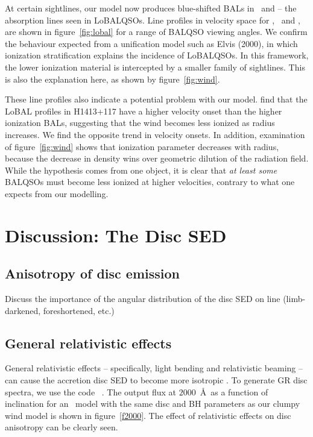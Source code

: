 \documentclass[preprint, a4paper, 11pt]{aastex}
\begin{document}
At certain sightlines, our model now produces blue-shifted BALs in \al\ and \mg --
the absorption lines seen in LoBALQSOs. Line profiles in velocity space 
for \civ, \al\ and \mg, are shown in figure~\ref{fig:lobal} for a range
of BALQSO viewing angles. We confirm the behaviour expected from 
a unification model such as Elvis (2000), in which ionization stratification
explains the incidence of LoBALQSOs. In this framework, the lower
ionization material is intercepted by a smaller family of sightlines.
This is also the explanation here, as shown by figure~\ref{fig:wind}.

These line profiles also indicate a potential problem with our model. 
\cite{odowd2015} find that the LoBAL profiles in H1413+117 have a 
higher velocity onset than the higher ionization BALs, suggesting that the
wind becomes less ionized as radius increases. 
We find the opposite trend in velocity onsets. In addition, examination of 
figure~\ref{fig:wind} shows that ionization parameter decreases with radius, 
because the decrease in density wins over geometric dilution of the radiation 
field. While the \cite{odowd2015} hypothesis comes from one object,
it is clear that {\em at least some} BALQSOs must become less ionized at 
higher velocities, contrary to what one expects from our modelling.





\clearpage
\section{Discussion: The Disc SED}

\subsection{Anisotropy of disc emission}

Discuss the importance of the angular distribution of the disc SED on line
(limb-darkened, foreshortened, etc.)

\subsection{General relativistic effects}

General relativistic effects -- specifically, light bending
and relativistic beaming -- can cause 
the accretion disc SED to become more isotropic \citep[e.g.][]{zhang1997,munozdarias2013}.
To generate GR disc spectra, we use the code \agn\ \citep{hubeny2000,davishubeny2006,davis2007}. 
The output flux at $2000$~\AA\ as a function of inclination
for an \agn\ model with the same disc and BH parameters
as our clumpy wind model is shown in figure~\ref{f2000}.
The effect of relativistic effects on disc anisotropy can be clearly seen.
\end{document}
